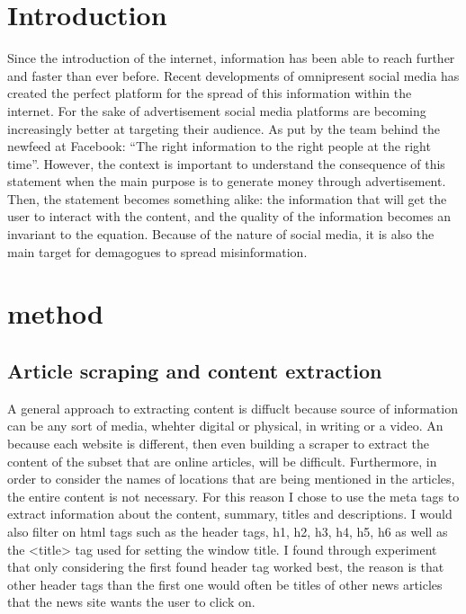 \documentclass{article}
\begin{document}
\section{Introduction}
Since the introduction of the internet, information has been able to reach further and faster than ever before. Recent developments of omnipresent social media has created the perfect platform for the spread of this information within the internet. For the sake of advertisement social media platforms are becoming increasingly better at targeting their audience. As put by the team behind the newfeed at Facebook: ``The right information to the right people at the right time''. However, the context is important to understand the consequence of this statement when the main purpose is to generate money through advertisement. Then, the statement becomes something alike: the information that will get the user to interact with the content, and the quality of the information becomes an invariant to the equation. 
Because of the nature of social media, it is also the main target for demagogues to spread misinformation.

\section{method}

\subsection{Article scraping and content extraction}
A general approach to extracting content is diffuclt because source of information can be any sort of media, whehter digital or physical, in writing or a video. An because each website is different, then even building a scraper to extract the content of the subset that are online articles, will be difficult. Furthermore, in order to consider the names of locations that are being mentioned in the articles, the entire content is not necessary. For this reason I chose to use the meta tags to extract information about the content, summary, titles and descriptions. I would also filter on html tags such as the header tags, h1, h2, h3, h4, h5, h6 as well as the <title> tag used for setting the window title. I found through experiment that only considering the first found header tag worked best, the reason is that other header tags than the first one would often be titles of other news articles that the news site wants the user to click on.
\end{document}
